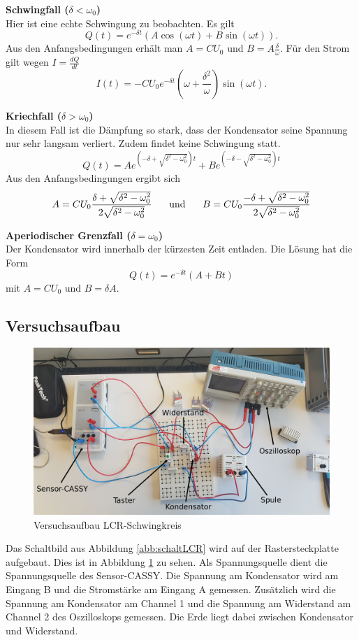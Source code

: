 \documentclass[a4paper, 12pt]{scrartcl}
\begin{document}
\textbf{Schwingfall ($\delta < \omega_0$)} \\
Hier ist eine echte Schwingung zu beobachten. Es gilt
$$Q(t) = e^{-\delta t}( A\cos(\omega t) + B\sin(\omega t)).$$
Aus den Anfangsbedingungen erhält man $A = CU_0$ und $B = A \frac{\delta}{\omega}$. Für den Strom gilt wegen $I = \frac{dQ}{dt}$
$$I(t) = -CU_0 e^{-\delta t} \left( \omega + \frac{\delta^2}{\omega}\right)\sin(\omega t).$$ 

\textbf{Kriechfall ($\delta > \omega_0$)} \\ 
In diesem Fall ist die Dämpfung so stark, dass der Kondensator seine Spannung nur sehr langsam verliert. Zudem findet keine Schwingung statt.
$$Q(t) = Ae^{\left( -\delta + \sqrt{\delta^2-\omega_0^2} \right)t} + Be^{\left(-\delta - \sqrt{\delta^2-\omega_0^2} \right)t}$$
Aus den Anfangsbedingungen ergibt sich
$$A = CU_0 \frac{\delta +\sqrt{\delta^2-\omega_0^2}}{2\sqrt{\delta^2-\omega_0^2}} \hspace{0.5cm} \text{ und } \hspace{0.5cm}
B = CU_0 \frac{-\delta+\sqrt{\delta^2-\omega_0^2}}{2\sqrt{\delta^2-\omega_0^2}}$$

\textbf{Aperiodischer Grenzfall ($\delta = \omega_0$)} \\
Der Kondensator wird innerhalb der kürzesten Zeit entladen. Die Lösung hat die Form
$$Q(t) = e^{-\delta t}(A + Bt)$$
mit $A = CU_0$ und $B=\delta A$.


\subsection{Versuchsaufbau}

\begin{figure}[H]
\centering
\includegraphics[width=\textwidth]{bilder/LCR_aufbau_beschriftet.jpg}
\caption{Versuchsaufbau LCR-Schwingkreis}
\label{abb:aufbau_lcr}
\end{figure}
Das Schaltbild aus Abbildung \ref{abb:schaltLCR} wird auf der Rastersteckplatte aufgebaut. Dies ist in Abbildung \ref{abb:aufbau_lcr} zu sehen. Als Spannungsquelle dient die Spannungsquelle des Sensor-CASSY. Die Spannung am Kondensator wird am Eingang B und die Stromstärke am Eingang A gemessen. Zusätzlich wird die Spannung am Kondensator am Channel 1 und die Spannung am Widerstand am Channel 2 des Oszilloskops gemessen. Die Erde liegt dabei zwischen Kondensator und Widerstand.
\end{document}
